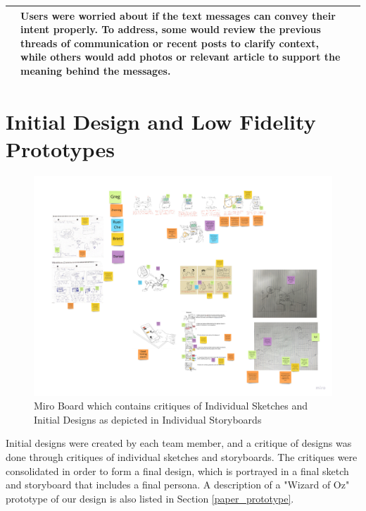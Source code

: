 \documentclass[acmsmall,screen,authorversion,nonacm]{acmart}
\begin{document}
\begin{table}[h]
\begin{center}
\begin{tabular}{|p{}|p{}|p{}|}
    & 
    Users were worried about if the text messages can convey their intent properly. To address, some would review the previous threads of communication or recent posts to clarify context, while others would add photos or relevant article to support the meaning behind the messages. 
    \\
    \hline
  \end{tabular}
  \end{center}
  \Description{}
\end{table}


\section{Initial Design and Low Fidelity Prototypes}

\begin{figure}[h]
\begin{center}
\includegraphics[width=1.0\linewidth]{figures/Assignment_3/DesignCritiques.jpg}
\caption{Miro Board which contains critiques of Individual Sketches and Initial Designs as depicted in Individual Storyboards}
\label{fig:critiques}
\Description{}
\end{center}
\end{figure}

Initial designs were created by each team member, and a critique of designs was done through critiques of individual sketches and storyboards. The critiques were consolidated in order to form a final design, which is portrayed in a final sketch and storyboard that includes a final persona. A description of a "Wizard of Oz" prototype of our design is also listed in Section \ref{paper_prototype}.
\end{document}
